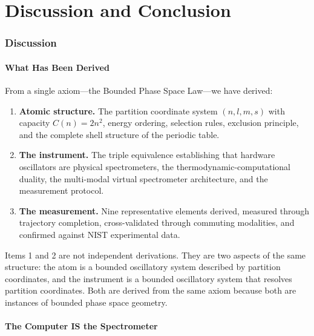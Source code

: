 \documentclass[11pt,twocolumn,a4paper]{article}
\theoremstyle{definition}
\theoremstyle{remark}
\begin{document}

\part{Discussion and Conclusion}

\section{Discussion}
\label{sec:discussion}

\subsection{What Has Been Derived}

From a single axiom---the Bounded Phase Space Law---we have derived:

\begin{enumerate}
\item \textbf{Atomic structure.} The partition coordinate system $(n, l, m, s)$ with capacity $C(n) = 2n^2$, energy ordering, selection rules, exclusion principle, and the complete shell structure of the periodic table.
\item \textbf{The instrument.} The triple equivalence establishing that hardware oscillators are physical spectrometers, the thermodynamic-computational duality, the multi-modal virtual spectrometer architecture, and the measurement protocol.
\item \textbf{The measurement.} Nine representative elements derived, measured through trajectory completion, cross-validated through commuting modalities, and confirmed against NIST experimental data.
\end{enumerate}

Items 1 and 2 are not independent derivations. They are two aspects of the same structure: the atom is a bounded oscillatory system described by partition coordinates, and the instrument is a bounded oscillatory system that resolves partition coordinates. Both are derived from the same axiom because both are instances of bounded phase space geometry.

\subsection{The Computer IS the Spectrometer}
\end{document}
